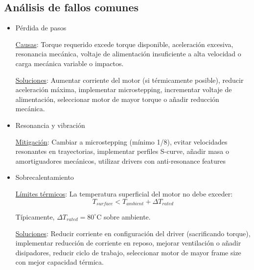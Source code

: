 \subsection{Análisis de fallos comunes}
\begin{itemize}[label=$\bullet$]

    \item{Pérdida de pasos}

\underline{Causas}: Torque requerido excede torque disponible, aceleración excesiva, resonancia mecánica, voltaje de alimentación insuficiente a alta velocidad o carga mecánica variable o impactos.

\underline{Soluciones}: Aumentar corriente del motor (si térmicamente posible), reducir aceleración máxima, implementar microstepping, incrementar voltaje de alimentación, seleccionar motor de mayor torque o añadir reducción mecánica.

    \item{Resonancia y vibración}

\underline{Mitigación}: Cambiar a microstepping (mínimo 1/8), evitar velocidades resonantes en trayectorias, implementar perfiles S-curve, añadir masa o amortiguadores mecánicos, utilizar drivers con anti-resonance features

    \item {Sobrecalentamiento}

\underline{Límites térmicos}: La temperatura superficial del motor no debe exceder:
\begin{equation}
T_{surface} < T_{ambient} + \Delta T_{rated}
\end{equation}

Típicamente, $\Delta T_{rated} = 80^\circ$C sobre ambiente.

\underline{Soluciones}: Reducir corriente en configuración del driver (sacrificando torque), implementar reducción de corriente en reposo, mejorar ventilación o añadir disipadores, reducir ciclo de trabajo, seleccionar motor de mayor frame size con mejor capacidad térmica.
\end{itemize}

